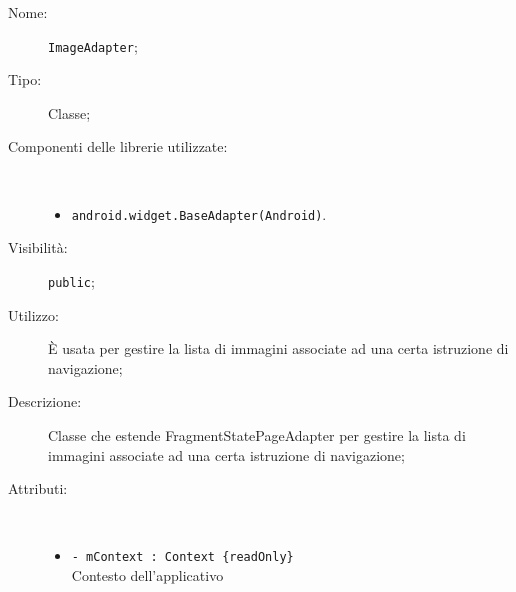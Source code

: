 \documentclass[../DefinizioneDiProdotto.tex]{subfiles}
\begin{document}
\begin{description}
	\item[Nome:] \texttt{ImageAdapter};
	\item[Tipo:] Classe;
	\item[Componenti delle librerie utilizzate:] \
	\begin{itemize}
		\item \texttt{android.widget.BaseAdapter(Android)}.
		
	\end{itemize}
	\item[Visibilità:] \texttt{public};
	\item[Utilizzo:] È usata per gestire la lista di immagini associate ad una certa istruzione di navigazione;
	\item[Descrizione:] Classe che estende FragmentStatePageAdapter per gestire la lista di immagini associate ad una certa istruzione di navigazione;
	\item[Attributi:] \
	\begin{itemize}
		\item \texttt{- mContext : Context \{readOnly\}}\\
		Contesto dell'applicativo
		

\end{itemize}
\end{description}
\end{document}
